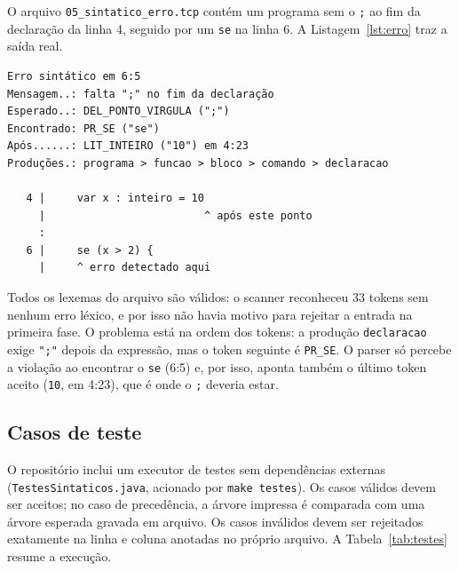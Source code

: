 \documentclass[conference,a4paper]{IEEEtran}
\newcommand{\cod}[1]{\texttt{#1}}
\begin{document}
O arquivo \cod{05\_sintatico\_erro.tcp} contém um programa sem o \cod{;} ao fim da declaração da linha 4, seguido por um \cod{se} na linha 6. A Listagem~\ref{lst:erro} traz a saída real.

\begin{lstlisting}[float=tb,style=saida,basicstyle=\ttfamily\fontsize{6.4}{7.6}\selectfont,caption={Diagnóstico do caso inválido (saída real)},label={lst:erro},breaklines=false]
Erro sintático em 6:5
Mensagem..: falta ";" no fim da declaração
Esperado..: DEL_PONTO_VIRGULA (";")
Encontrado: PR_SE ("se")
Após......: LIT_INTEIRO ("10") em 4:23
Produções.: programa > funcao > bloco > comando > declaracao

   4 |     var x : inteiro = 10
     |                         ^ após este ponto
     :
   6 |     se (x > 2) {
     |     ^ erro detectado aqui
\end{lstlisting}

Todos os lexemas do arquivo são válidos: o scanner reconheceu 33 tokens sem nenhum erro léxico, e por isso não havia motivo para rejeitar a entrada na primeira fase. O problema está na ordem dos tokens: a produção \cod{declaracao} exige \cod{";"} depois da expressão, mas o token seguinte é \cod{PR\_SE}. O parser só percebe a violação ao encontrar o \cod{se} (6:5) e, por isso, aponta também o último token aceito (\cod{10}, em 4:23), que é onde o \cod{;} deveria estar.

\subsection{Casos de teste}

O repositório inclui um executor de testes sem dependências externas (\cod{TestesSintaticos.java}, acionado por \cod{make testes}). Os casos válidos devem ser aceitos; no caso de precedência, a árvore impressa é comparada com uma árvore esperada gravada em arquivo. Os casos inválidos devem ser rejeitados exatamente na linha e coluna anotadas no próprio arquivo. A Tabela~\ref{tab:testes} resume a execução.
\end{document}
